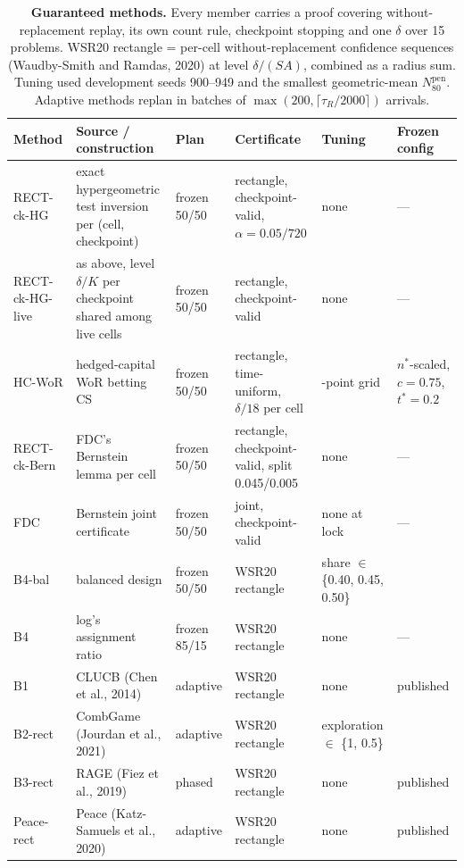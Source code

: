 \documentclass[sigconf,anonymous,review]{acmart}
\newcommand{\Npen}{N_{80}^{\text{pen}}}
\begin{document}
\begin{table}[t]
\caption{\textbf{Guaranteed methods.} Every member carries a proof covering without-replacement replay, its own count rule, checkpoint stopping and one $\delta$ over 15 problems. WSR20 rectangle = per-cell without-replacement confidence sequences (Waudby-Smith and Ramdas, 2020) at level $\delta/(SA)$, combined as a radius sum. Tuning used development seeds 900--949 and the smallest geometric-mean $\Npen$. Adaptive methods replan in batches of $\max(200,\lceil\tau_R/2000\rceil)$ arrivals.}
\label{tab:rivals}
\small
\begin{tabular}{@{}l>{\raggedright\arraybackslash}p{4.0cm}>{\raggedright\arraybackslash}p{2.1cm}>{\raggedright\arraybackslash}p{3.3cm}>{\raggedright\arraybackslash}p{2.5cm}>{\raggedright\arraybackslash}p{2.0cm}@{}}
\toprule
Method & Source / construction & Plan & Certificate & Tuning & Frozen config \\
\midrule
RECT-ck-HG & exact hypergeometric test inversion per (cell, checkpoint) & frozen 50/50 & rectangle, checkpoint-valid, $\alpha = 0.05/720$ & none & --- \\
RECT-ck-HG-live & as above, level $\delta/K$ per checkpoint shared among live cells & frozen 50/50 & rectangle, checkpoint-valid & none & --- \\
HC-WoR & hedged-capital WoR betting CS & frozen 50/50 & rectangle, time-uniform, $\delta/18$ per cell & 6-point grid & $n^*$-scaled, $c = 0.75$, $t^* = 0.2$ \\
RECT-ck-Bern & FDC's Bernstein lemma per cell & frozen 50/50 & rectangle, checkpoint-valid, split 0.045/0.005 & none & --- \\
FDC & Bernstein joint certificate & frozen 50/50 & joint, checkpoint-valid & none at lock & --- \\
B4-bal & balanced design & frozen 50/50 & WSR20 rectangle & share $\in$ \{0.40, 0.45, 0.50\} & 0.50 \\
B4 & log's assignment ratio & frozen 85/15 & WSR20 rectangle & none & --- \\
B1 & CLUCB (Chen et al., 2014) & adaptive & WSR20 rectangle & none & published \\
B2-rect & CombGame (Jourdan et al., 2021) & adaptive & WSR20 rectangle & exploration $\in$ \{1, 0.5\} & 1.0 \\
B3-rect & RAGE (Fiez et al., 2019) & phased & WSR20 rectangle & none & published \\
Peace-rect & Peace (Katz-Samuels et al., 2020) & adaptive & WSR20 rectangle & none & published \\

\end{tabular}
\end{table}
\end{document}
